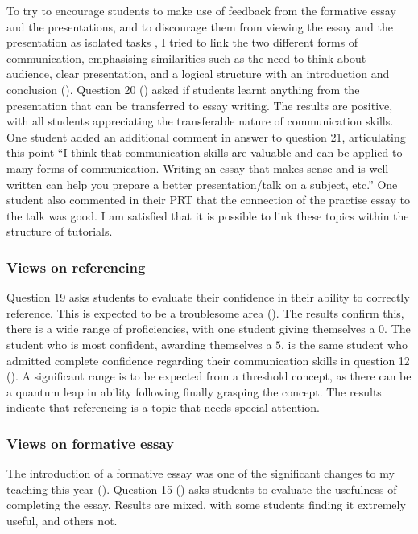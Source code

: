 To try to encourage students to make use of feedback from the formative essay and the presentations, and to discourage them from viewing the essay and the presentation as isolated tasks \citep[cf.][]{Housell2003}, I tried to link the two different forms of communication, emphasising similarities such as the need to think about audience, clear presentation, and a logical structure with an introduction and conclusion (). Question 20 () asked if students learnt anything from the presentation that can be transferred to essay writing. The results are positive, with all students appreciating the transferable nature of communication skills. One student added an additional comment in answer to question 21, articulating this point ``I think that communication skills are valuable and can be applied to many forms of communication. Writing an essay that makes sense and is well written can help you prepare a better presentation/talk on a subject, etc.'' One student also commented in their PRT that the connection of the practise essay to the talk was good. I am satisfied that it is possible to link these topics within the structure of tutorials.

\subsubsection{Views on referencing}\label{sec:referencing}

Question 19 asks students to evaluate their confidence in their ability to correctly reference. This is expected to be a troublesome area (). The results confirm this, there is a wide range of proficiencies, with one student giving themselves a $0$. The student who is most confident, awarding themselves a $5$, is the same student who admitted complete confidence regarding their communication skills in question 12 (). A significant range is to be expected from a threshold concept, as there can be a quantum leap in ability following finally grasping the concept. The results indicate that referencing is a topic that needs special attention.

\subsubsection{Views on formative essay}\label{sec:views-form}

The introduction of a formative essay was one of the significant changes to my teaching this year (). Question 15 () asks students to evaluate the usefulness of completing the essay. Results are mixed, with some students finding it extremely useful, and others not.

